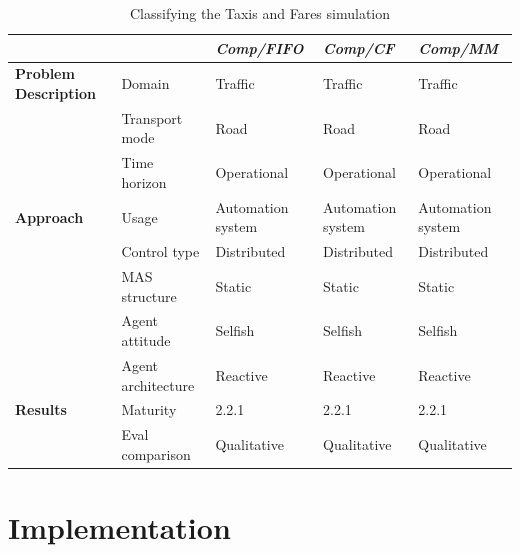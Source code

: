 \documentclass[11pt,letterpaper,onecolumn,twoside,openright,draft]{report}
\begin{document}
\begin{table}[htbp]
\begin{tabular}{|l|p{}|p{}|p{}|p{}|}
          &       & \emph{\textbf{Comp/FIFO}} & \emph{\textbf{Comp/CF}} & \emph{\textbf{Comp/MM}} \\
          \hline
          \hline
    \textbf{Problem Description} & Domain & Traffic & Traffic & Traffic \\
          \cline{2-5}
          & Transport mode & Road  & Road  & Road \\
          \cline{2-5}
          & Time horizon & Operational & Operational & Operational \\
          \hline
    \textbf{Approach} & Usage & Automation system & Automation system & Automation system \\
          \cline{2-5}
          & Control type & Distributed & Distributed & Distributed \\
          \cline{2-5}
          & MAS structure & Static & Static & Static \\
          \cline{2-5}
          & Agent attitude & Selfish & Selfish & Selfish \\
          \cline{2-5}
          & Agent architecture & Reactive & Reactive & Reactive \\
          \hline
    \textbf{Results} & Maturity & 2.2.1 & 2.2.1 & 2.2.1 \\
          \cline{2-5}
          & Eval comparison & Qualitative & Qualitative & Qualitative \\
    \hline
    \end{tabular}%
  \caption{Classifying the Taxis and Fares simulation}
  \label{tab:classifying-taxis-and-fares-sim}%
\end{table}%



\chapter{Implementation}
\end{document}
